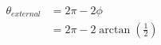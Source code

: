 \documentclass[12pt]{article}
\begin{document}
\begin{align*}
\theta_{external} &= 2\pi - 2\phi \\
                  &= 2\pi - 2\arctan\left(\frac{1}{2}\right)
\end{align*}
\end{document}
